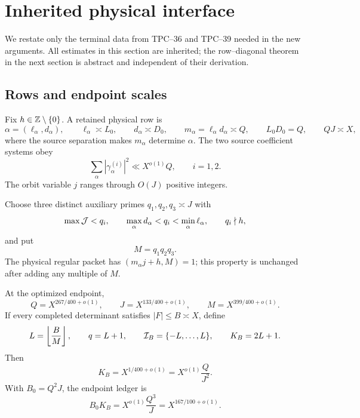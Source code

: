 \section{Inherited physical interface}
\label{sec:tpc41-interface}

We restate only the terminal data from TPC--36 and TPC--39 needed in the
new arguments.  All estimates in this section are inherited; the
row--diagonal theorem in the next section is abstract and independent of
their derivation.

\subsection{Rows and endpoint scales}

Fix \(h\in\mathbb Z\setminus\{0\}\).  A retained physical row is
\begin{equation}
 \alpha=(\ell_\alpha,d_\alpha),
 \qquad
 \ell_\alpha\asymp L_0,
 \qquad
 d_\alpha\asymp D_0,
 \qquad
 m_\alpha=\ell_\alpha d_\alpha\asymp Q,
 \qquad
 L_0D_0=Q,
 \qquad
 QJ\asymp X,
 \label{eq:tpc41-interface-row}
\end{equation}
where the source separation makes \(m_\alpha\) determine \(\alpha\).
The two source coefficient systems obey
\begin{equation}
 \sum_\alpha|\gamma_\alpha^{(i)}|^2
 \ll X^{o(1)}Q,
 \qquad i=1,2.
 \label{eq:tpc41-interface-source-l2}
\end{equation}
The orbit variable \(j\) ranges through \(O(J)\) positive integers.

Choose three distinct auxiliary primes \(q_1,q_2,q_3\asymp J\) with
\begin{equation}
 \max\mathcal J<q_i,
 \qquad
 \max_\alpha d_\alpha<q_i<\min_\alpha\ell_\alpha,
 \qquad
 q_i\nmid h,
 \label{eq:tpc41-interface-primes}
\end{equation}
and put
\begin{equation}
 M=q_1q_2q_3.
 \label{eq:tpc41-interface-M}
\end{equation}
The physical regular packet has \((m_\alpha j+h,M)=1\); this property is
unchanged after adding any multiple of \(M\).

At the optimized endpoint,
\begin{equation}
 Q=X^{267/400+o(1)},
 \qquad
 J=X^{133/400+o(1)},
 \qquad
 M=X^{399/400+o(1)}.
 \label{eq:tpc41-interface-endpoint}
\end{equation}
If every completed determinant satisfies \(|F|\le B\asymp X\), define
\begin{equation}
 L=\left\lfloor\frac BM\right\rfloor,
 \qquad
 q=L+1,
 \qquad
 \mathcal I_B=\{-L,\ldots,L\},
 \qquad
 K_B=2L+1.
 \label{eq:tpc41-interface-aliases}
\end{equation}
Then
\begin{equation}
 K_B=X^{1/400+o(1)}
 =X^{o(1)}\frac{Q}{J^2}.
 \label{eq:tpc41-interface-alias-scale}
\end{equation}
With \(B_0=Q^2J\), the endpoint ledger is
\begin{equation}
 \boxed{
 B_0K_B
 =X^{o(1)}\frac{Q^3}{J}
 =X^{167/100+o(1)}.}
 \label{eq:tpc41-interface-key-ledger}
\end{equation}

